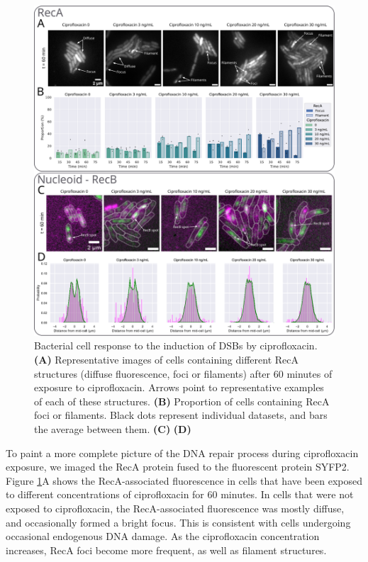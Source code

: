 \begin{figure}[htbp]
    \centering
    \includegraphics[width=.8\textwidth]{Figures/Fig4_cipro_30ngmL.pdf}
    \caption{Bacterial cell response to the induction of DSBs by ciprofloxacin. \textbf{(A)} Representative images of cells containing different RecA structures (diffuse fluorescence, foci or filaments) after 60 minutes of exposure to ciprofloxacin. Arrows point to representative examples of each of these structures. \textbf{(B)} Proportion of cells containing RecA foci or filaments. Black dots represent individual datasets, and bars the average between them. \textbf{(C)}  \textbf{(D)} }
    \label{Fig:reca_nucleoid}
\end{figure}

To paint a more complete picture of the DNA repair process during ciprofloxacin exposure, we imaged the RecA protein fused to the fluorescent protein SYFP2. Figure \ref{Fig:reca_nucleoid}A shows the RecA-associated fluorescence in cells that have been exposed to different concentrations of ciprofloxacin for 60 minutes. In cells that were not exposed to ciprofloxacin, the RecA-associated fluorescence was mostly diffuse, and occasionally formed a bright focus. This is consistent with cells undergoing occasional endogenous DNA damage. As the ciprofloxacin concentration increases, RecA foci become more frequent, as well as filament structures.

